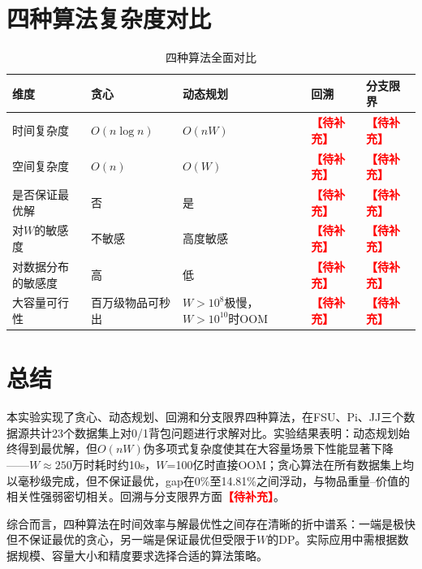 \documentclass[6pt,a4paper]{ctexart}
\newcommand{\tb}{\textcolor{red}{\textbf{【待补充】}}}
\begin{document}
\section{四种算法复杂度对比}

\begin{table}[ht]
\centering
\caption{四种算法全面对比}
\begin{tabular}{p{2.5cm}p{2.8cm}p{2.8cm}p{2.8cm}p{2.8cm}}
\toprule
维度 & 贪心 & 动态规划 & 回溯 & 分支限界 \\
\midrule
时间复杂度 & $O(n \log n)$ & $O(nW)$ & \tb & \tb \\
空间复杂度 & $O(n)$ & $O(W)$ & \tb & \tb \\
是否保证最优解 & 否 & 是 & \tb & \tb \\
对$W$的敏感度 & 不敏感 & 高度敏感 & \tb & \tb \\
对数据分布的敏感度 & 高 & 低 & \tb & \tb \\
大容量可行性 & 百万级物品可秒出 & $W>10^8$极慢，$W>10^{10}$时OOM & \tb & \tb \\
\bottomrule
\end{tabular}
\end{table}


\section{总结}

本实验实现了贪心、动态规划、回溯和分支限界四种算法，在FSU、Pi、JJ三个数据源共计23个数据集上对0/1背包问题进行求解对比。实验结果表明：动态规划始终得到最优解，但$O(nW)$伪多项式复杂度使其在大容量场景下性能显著下降——$W \approx 250$万时耗时约10s，$W$=100亿时直接OOM；贪心算法在所有数据集上均以毫秒级完成，但不保证最优，gap在0\%至14.81\%之间浮动，与物品重量--价值的相关性强弱密切相关。回溯与分支限界方面\tb。

综合而言，四种算法在时间效率与解最优性之间存在清晰的折中谱系：一端是极快但不保证最优的贪心，另一端是保证最优但受限于$W$的DP。实际应用中需根据数据规模、容量大小和精度要求选择合适的算法策略。
\end{document}
